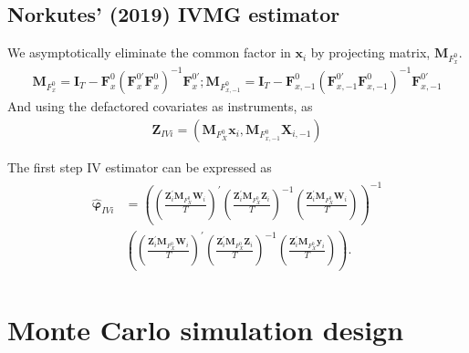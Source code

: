 \documentclass[12pt,a4paper,hyperref]{article}
\begin{document}
\subsection{Norkutes' (2019) IVMG estimator}
 We asymptotically eliminate the common factor in $\boldsymbol{x}_{i}$ by projecting matrix, $\boldsymbol{M}_{F^{0}_{x}}$.
 \begin{align}
 \boldsymbol{M}_{F^{0}_{x}}=\boldsymbol{I}_{T}-\boldsymbol{F}^{0}_{x}\left(\boldsymbol{F}^{0'}_{x}\boldsymbol{F}^{0}_{x}  \right)^{-1}\boldsymbol{F}^{0'}_{x} ; \boldsymbol{M}_{F^{0}_{x,-1}}=\boldsymbol{I}_{T}-\boldsymbol{F}^{0}_{x,-1}\left(\boldsymbol{F}^{0'}_{x,-1}\boldsymbol{F}^{0}_{x,-1}  \right)^{-1}\boldsymbol{F}^{0'}_{x,-1}
 \end{align}
And using the defactored covariates as instruments, as
\begin{align}
\boldsymbol{Z}_{IVi}=\left(\boldsymbol{M}_{F^{0}_{X}}\boldsymbol{x}_{i}, \boldsymbol{M}_{F^{0}_{x,-1}}\boldsymbol{X}_{i,-1}  \right)
\end{align}

The first step IV estimator can be expressed as
\begin{align}
\begin{split}
\boldsymbol{\hat{\varphi}}_{IVi}&=\left(\left(\frac{\boldsymbol{Z}^{'}_{i}\boldsymbol{M}_{F^{0}_{X}}\boldsymbol{W}_{i}}{T } \right)^{'} \left(\frac{\boldsymbol{Z}^{'}_{i}\boldsymbol{M}_{F^{0}_{X}}\boldsymbol{Z}_{i}}{T}  \right)^{-1}  \left(\frac{\boldsymbol{Z}^{'}_{i}\boldsymbol{M}_{F^{0}_{X}}\boldsymbol{W}_{i}}{T}  \right)\right)^{-1} \\
&\left(\left( \frac{\boldsymbol{Z}^{'}_{i}\boldsymbol{M}_{F^{0}_{X}}\boldsymbol{W}_{i}}{T}  \right)^{'} \left(\frac{\boldsymbol{Z}^{'}_{i}\boldsymbol{M}_{F^{0}_{X}}\boldsymbol{Z}_{i}}{T}  \right)^{-1}  \left(\frac{\boldsymbol{Z}^{'}_{i}\boldsymbol{M}_{F^{0}_{X}}\boldsymbol{y}_{i}}{T}  \right)\right).
\end{split}
\end{align}







\section{Monte Carlo simulation design}
\end{document}
